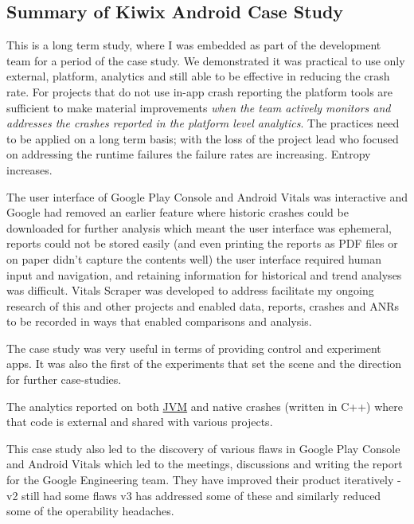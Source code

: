 \subsection{Summary of Kiwix Android Case Study}

This is a long term study, where I was embedded as part of the development team for a period of the case study. We demonstrated it was practical to use only external, platform, analytics and still able to be effective in reducing the crash rate. For projects that do not use in-app crash reporting the platform tools are sufficient to make material improvements \emph{when the team actively monitors and addresses the crashes reported in the platform level analytics}. The practices need to be applied on a long term basis; with the loss of the project lead who focused on addressing the runtime failures the failure rates are increasing. Entropy increases.


The user interface of Google Play Console and Android Vitals was interactive and Google had removed an earlier feature where historic crashes could be downloaded for further analysis which meant the user interface was ephemeral, reports could not be stored easily (and even printing the reports as PDF files or on paper didn't capture the contents well) the user interface required human input and navigation, and retaining information for historical and trend analyses was difficult. Vitals Scraper was developed to address facilitate my ongoing research of this and other projects and enabled data, reports, crashes and ANRs to be recorded in ways that enabled comparisons and analysis. 

The case study was very useful in terms of providing  control and experiment apps. It was also the first of the experiments that set the scene and the direction for further case-studies.

The analytics reported on both \href{glossary_jvm}{JVM} and native crashes (written in C++) where that code is external and shared with various projects. 

This case study also led to the discovery of various flaws in Google Play Console and Android Vitals which led to the meetings, discussions and writing the report for the Google Engineering team. They have improved their product iteratively - v2 still had some flaws v3 has addressed some of these and similarly reduced some of the operability headaches.




